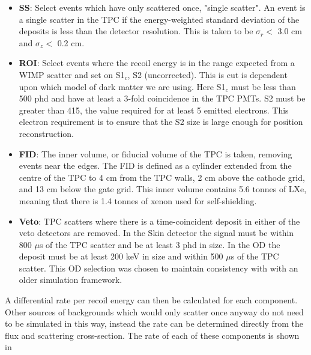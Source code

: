 \par


\begin{itemize}
    \item \textbf{SS}: Select events which have only scattered once, "single scatter". An event is a single scatter in the TPC if the energy-weighted standard deviation of the deposits is less than the detector resolution. This is taken to be $\sigma_r <$ 3.0 cm and $\sigma_z <$ 0.2 cm.
    \item \textbf{ROI}: Select events where the recoil energy is in the range expected from a WIMP scatter and set on S1$_c$, S2 (uncorrected). This is cut is dependent upon which model of dark matter we are using. Here S1$_c$ must be less than 500 phd and have at least a 3-fold coincidence in the TPC PMTs. S2 must be greater than 415, the value required for at least 5 emitted electrons. This electron requirement is to ensure that the S2 size is large enough for position reconstruction.
    \item \textbf{FID}: The inner volume, or fiducial volume of the TPC is taken, removing events near the edges. The FID is defined as a cylinder extended from the centre of the TPC to 4 cm from the TPC walls, 2 cm above the cathode grid, and 13 cm below the gate grid. This inner volume contains 5.6 tonnes of LXe, meaning that there is 1.4 tonnes of xenon used for self-shielding.
    \item \textbf{Veto}: TPC scatters where there is a time-coincident deposit in either of the veto detectors are removed. In the Skin detector the signal must be within 800 $\mu$s of the TPC scatter and be at least 3 phd in size. In the OD the deposit must be at least 200 keV in size and within 500 $\mu$s of the TPC scatter. This OD selection was chosen to maintain consistency with \cite{LZ_projected_sensitivity_paper_ref} with an older simulation framework.
\end{itemize}
A differential rate per recoil energy can then be calculated for each component.
Other sources of backgrounds which would only scatter once anyway do not need to be simulated in this way, instead the rate can be determined directly from the flux and scattering cross-section.
The rate of each of these components is shown in 

